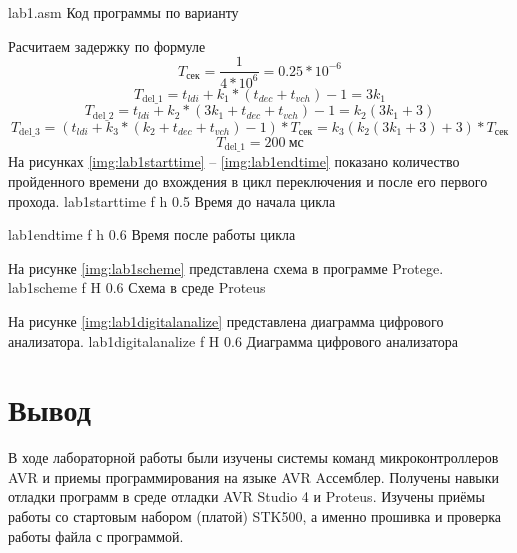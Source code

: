 \documentclass{bmstu}
\begin{document}
    {lab1.asm}
    {Код программы по варианту}
    
Расчитаем задержку по формуле
\[T_{\text{сек}} = \frac{1}{4 * 10^{6}} = 0.25 * 10^{-6}\]
\[T_{\text{del\_1}} = t_{ldi} + k_1 *(t_{dec} + t_{vch}) - 1 = 3k_1\]
\[T_{\text{del\_2}} = t_{ldi} + k_2 *(3k_1 + t_{dec} + t_{vch}) - 1 = k_2(3k_1 + 3)\]
\[T_{\text{del\_3}} = (t_{ldi} + k_3 *(k_2 + t_{dec} + t_{vch}) - 1) * T_{\text{сек}} = k_3(k_2(3k_1 + 3) +3) * T_{\text{сек}}\]
\[T_{\text{del\_1}} = 200~\text{мс}\]
На рисунках \ref{img:lab1starttime} -- \ref{img:lab1endtime} показано количество пройденного времени до вхождения в цикл переключения и после его первого прохода.
    {lab1starttime} %
    {f} %
    {h} %
    {0.5\textwidth} %
    {Время до начала цикла} %

    {lab1endtime} %
    {f} %
    {h} %
    {0.6\textwidth} %
    {Время после работы цикла} %
    
На рисунке \ref{img:lab1scheme} представлена схема в программе Protege.
    {lab1scheme} %
    {f} %
    {H} %
    {0.6\textwidth} %
    {Схема в среде Proteus} %
    
На рисунке \ref{img:lab1digitalanalize} представлена диаграмма цифрового анализатора.
    {lab1digitalanalize} %
    {f} %
    {H} %
    {0.6\textwidth} %
    {Диаграмма цифрового анализатора} %

\section{Вывод}
В ходе лабораторной работы были изучены системы команд микроконтроллеров AVR и
приемы программирования на языке AVR Aссемблер. Получены навыки
отладки программ в среде отладки AVR Studio 4 и Proteus. Изучены приёмы
работы со стартовым набором (платой) STK500, а именно прошивка и проверка работы файла с программой.
\newpage
\end{document}
